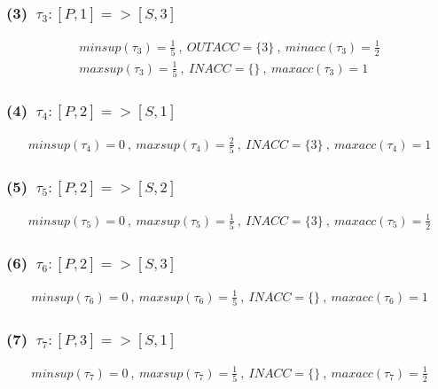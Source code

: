 \documentclass[a4paper,12pt]{jarticle}
\begin{document}
\subsubsection*{(3)~$\tau_3:[P,1]=>[S,3]$}
\vspace{-4mm}
%
\begin{align*}
 minsup(\tau_3)=\frac{1}{5}~,~OUTACC=\{3\}~,~minacc(\tau_3)=\frac{1}{2}\\
 maxsup(\tau_3)=\frac{1}{5}~,~INACC=\{\}~,~maxacc(\tau_3)=1
\end{align*}
%
\vspace{-10mm}
\subsubsection*{(4)~$\tau_4:[P,2]=>[S,1]$}
\vspace{-4mm}
%
\begin{align*}
 minsup(\tau_4)=0~,~maxsup(\tau_4)=\frac{2}{5}~,~INACC=\{3\}~,~maxacc(\tau_4)=1
\end{align*}
%
\vspace{-10mm}
\subsubsection*{(5)~$\tau_5:[P,2]=>[S,2]$}
\vspace{-4mm}
%
\begin{align*}
 minsup(\tau_5)=0~,~maxsup(\tau_5)=\frac{1}{5}~,~INACC=\{3\}~,~maxacc(\tau_5)=\frac{1}{2}
\end{align*}
%
\vspace{-10mm}
\subsubsection*{(6)~$\tau_6:[P,2]=>[S,3]$}
\vspace{-4mm}
%
\begin{align*}
 minsup(\tau_6)=0~,~maxsup(\tau_6)=\frac{1}{5}~,~INACC=\{\}~,~maxacc(\tau_6)=1
\end{align*}
%
\vspace{-10mm}
\subsubsection*{(7)~$\tau_7:[P,3]=>[S,1]$}
\vspace{-4mm}
%
\begin{align*}
 minsup(\tau_7)=0~,~maxsup(\tau_7)=\frac{1}{5}~,~INACC=\{\}~,~maxacc(\tau_7)=\frac{1}{2}
\end{align*}
%
\vspace{-10mm}
\end{document}
